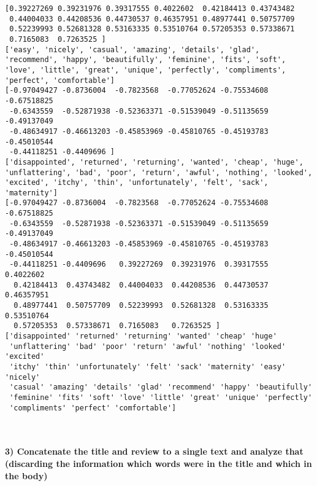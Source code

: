 \documentclass[11pt]{article}
\begin{document}
    \begin{Verbatim}[commandchars=\\\{\}]
[0.39227269 0.39231976 0.39317555 0.4022602  0.42184413 0.43743482
 0.44004033 0.44208536 0.44730537 0.46357951 0.48977441 0.50757709
 0.52239993 0.52681328 0.53163335 0.53510764 0.57205353 0.57338671
 0.7165083  0.7263525 ]
['easy', 'nicely', 'casual', 'amazing', 'details', 'glad', 'recommend', 'happy', 'beautifully', 'feminine', 'fits', 'soft', 'love', 'little', 'great', 'unique', 'perfectly', 'compliments', 'perfect', 'comfortable']
[-0.97049427 -0.8736004  -0.7823568  -0.77052624 -0.75534608 -0.67518825
 -0.6343559  -0.52871938 -0.52363371 -0.51539049 -0.51135659 -0.49137049
 -0.48634917 -0.46613203 -0.45853969 -0.45810765 -0.45193783 -0.45010544
 -0.44118251 -0.4409696 ]
['disappointed', 'returned', 'returning', 'wanted', 'cheap', 'huge', 'unflattering', 'bad', 'poor', 'return', 'awful', 'nothing', 'looked', 'excited', 'itchy', 'thin', 'unfortunately', 'felt', 'sack', 'maternity']
[-0.97049427 -0.8736004  -0.7823568  -0.77052624 -0.75534608 -0.67518825
 -0.6343559  -0.52871938 -0.52363371 -0.51539049 -0.51135659 -0.49137049
 -0.48634917 -0.46613203 -0.45853969 -0.45810765 -0.45193783 -0.45010544
 -0.44118251 -0.4409696   0.39227269  0.39231976  0.39317555  0.4022602
  0.42184413  0.43743482  0.44004033  0.44208536  0.44730537  0.46357951
  0.48977441  0.50757709  0.52239993  0.52681328  0.53163335  0.53510764
  0.57205353  0.57338671  0.7165083   0.7263525 ]
['disappointed' 'returned' 'returning' 'wanted' 'cheap' 'huge'
 'unflattering' 'bad' 'poor' 'return' 'awful' 'nothing' 'looked' 'excited'
 'itchy' 'thin' 'unfortunately' 'felt' 'sack' 'maternity' 'easy' 'nicely'
 'casual' 'amazing' 'details' 'glad' 'recommend' 'happy' 'beautifully'
 'feminine' 'fits' 'soft' 'love' 'little' 'great' 'unique' 'perfectly'
 'compliments' 'perfect' 'comfortable']

    \end{Verbatim}

    \begin{center}
    \end{center}
    { \hspace*{\fill} \\}
    
    \paragraph{3) Concatenate the title and review to a single text and
analyze that (discarding the information which words were in the title
and which in the
body)}\label{concatenate-the-title-and-review-to-a-single-text-and-analyze-that-discarding-the-information-which-words-were-in-the-title-and-which-in-the-body}
\end{document}
